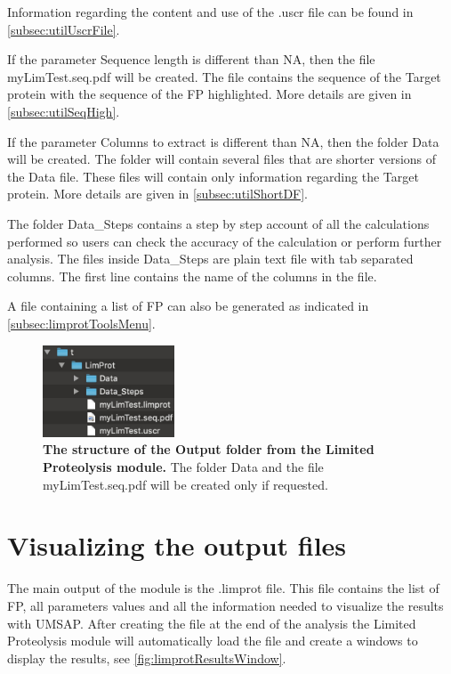 Information regarding the content and use of the .uscr file can be found in \autoref{subsec:utilUscrFile}.

If the parameter Sequence length is different than NA, then the file myLimTest.seq.pdf will be created. The file contains the sequence of the Target protein with the sequence of the FP highlighted. More details are given in \autoref{subsec:utilSeqHigh}.

If the parameter Columns to extract is different than NA, then the folder Data will be created. The folder will contain several files that are shorter versions of the Data file. These files will contain only information regarding the Target protein. More details are given in \autoref{subsec:utilShortDF}.

The folder Data\_Steps contains a step by step account of all the calculations performed so users can check the accuracy of the calculation or perform further analysis. The files inside Data\_Steps are plain text file with tab separated columns. The first line contains the name of the columns in the file.

A file containing a list of FP can also be generated as indicated in \autoref{subsec:limprotToolsMenu}.

\begin{figure}[h]
	\centering
	\includegraphics[width=0.35\textwidth]{./IMAGES/MOD-LIMPROT/limprot-files.jpg}	    
	\caption[The structure of the Output folder from the Limited Proteolysis module]{\textbf{The structure of the Output folder from the Limited Proteolysis module.} The folder Data and the file myLimTest.seq.pdf will be created only if requested.} 
	\label{fig:limprotOutFolder}
	\vspace{-5pt} 	
\end{figure}

\section{Visualizing the output files}

The main output of the module is the .limprot file. This file contains the list of FP,  all parameters values and all the information needed to visualize the results with UMSAP. After creating the file at the end of the analysis the Limited Proteolysis module will automatically load the file and create a windows to display the results, see \autoref{fig:limprotResultsWindow}.

